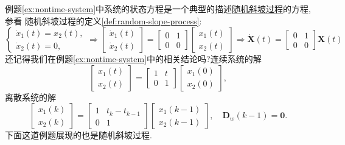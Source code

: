\documentclass[cn,10pt,citestyle=gb7714-2015,bibstyle=gb7714-2015]{elegantbook}
\begin{document}
例题\ref{ex:nontime-system}中系统的状态方程是一个典型的描述\uline{随机斜坡过程}的方程,参看
随机斜坡过程的定义\ref{def:random-slope-process}:
\[
    \begin{cases}
      \dot{x}_1(t)=x_2(t),\\
      \dot{x}_2(t)=0,
    \end{cases}\Longrightarrow\begin{bmatrix}
      \dot{x}_1(t)\\
      \dot{x}_2(t)
    \end{bmatrix}=\begin{bmatrix}
      0&1\\
      0&0
    \end{bmatrix}\begin{bmatrix}
      x_1(t)\\
      x_2(t)
    \end{bmatrix}\Longrightarrow\dot{\bm{X}}(t)=\begin{bmatrix}
      0&1\\
      0&0
    \end{bmatrix}\bm{X}(t)
\]
还记得我们在例题\ref{ex:nontime-system}中的相关结论吗?连续系统的解
\[
    \begin{bmatrix}
      x_1(t)\\
      x_2(t)
    \end{bmatrix}=
    \begin{bmatrix}
      1&t\\
      0&1
    \end{bmatrix}\begin{bmatrix}
      x_1(0)\\
      x_2(0)
    \end{bmatrix},
\]
离散系统的解
\[
    \begin{bmatrix}
      x_1(k)\\
      x_2(k)
    \end{bmatrix}=
    \begin{bmatrix}
      1&t_{k}-t_{k-1}\\
      0&1
    \end{bmatrix}\begin{bmatrix}
      x_1(k-1)\\
      x_2(k-1)
    \end{bmatrix},\quad \bm{D}_w(k-1)=\bm{0}.
\]
下面这道例题展现的也是随机斜坡过程.
\end{document}
